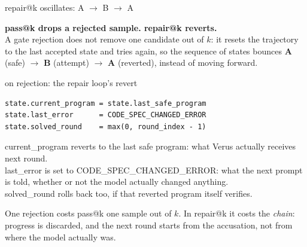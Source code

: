 \documentclass[aspectratio=169,10pt]{beamer}
\newcommand{\code}[1]{{\ttfamily #1}}
\newcommand{\hd}[1]{\textbf{\color{lgTeal}#1}}
\begin{document}
\begin{frame}[fragile]{repair@k oscillates: A $\to$ B $\to$ A}

{\scriptsize
\hd{pass@k drops a rejected sample. repair@k reverts.}\\
A gate rejection does not remove one candidate out of $k$: it resets the trajectory to the
last accepted state and tries again, so the sequence of states bounces \textbf{A} (safe)
$\to$ \textbf{B} (attempt) $\to$ \textbf{A} (reverted), instead of moving forward.
}

\vspace{8pt}
\begin{center}
\begin{codebox}[lgRed]{on rejection: the repair loop's revert}
\begin{lstlisting}
state.current_program = state.last_safe_program
state.last_error      = CODE_SPEC_CHANGED_ERROR
state.solved_round    = max(0, round_index - 1)
\end{lstlisting}
\end{codebox}
\end{center}

\vspace{6pt}
{\scriptsize
\code{current\_program} reverts to the last safe program: what Verus actually receives next
round.\\
\code{last\_error} is set to \code{CODE\_SPEC\_CHANGED\_ERROR}: what the next prompt is told,
whether or not the model actually changed anything.\\
\code{solved\_round} rolls back too, if that reverted program itself verifies.
}

\vspace{6pt}
{\scriptsize\color{lgGrey} One rejection costs pass@k one sample out of $k$. In repair@k it
costs the \emph{chain}: progress is discarded, and the next round starts from the accusation,
not from where the model actually was.}

\end{frame}
\end{document}
